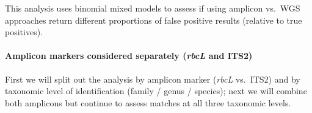 \documentclass[
]{article}
\begin{document}
This analysis uses binomial mixed models to assess if using amplicon
vs.~WGS approaches return different proportions of false positive
results (relative to true positives).

\hypertarget{amplicon-markers-considered-separately-rbcl-and-its2}{%
\paragraph{\texorpdfstring{Amplicon markers considered separately
(\emph{rbcL} and
ITS2)}{Amplicon markers considered separately (rbcL and ITS2)}}\label{amplicon-markers-considered-separately-rbcl-and-its2}}

First we will split out the analysis by amplicon marker (\emph{rbcL}
vs.~ITS2) and by taxonomic level of identification (family / genus /
species); next we will combine both amplicons but continue to assess
matches at all three taxonomic levels.
\end{document}
